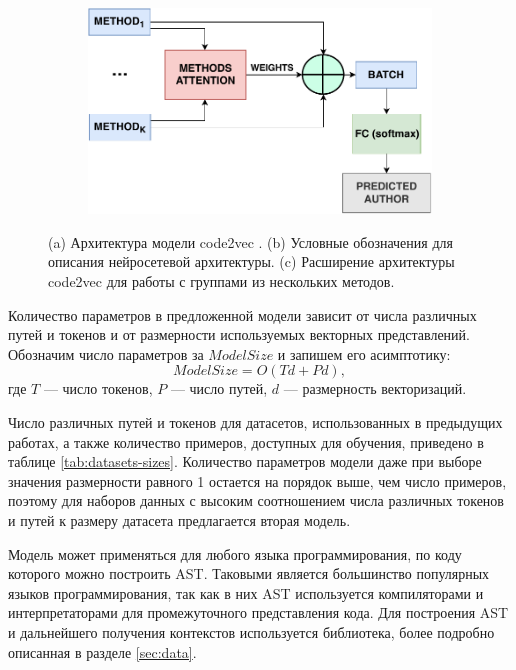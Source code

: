 \begin{figure}[ht]
\begin{subfigure}{0.34\linewidth}
       \caption{}
       \label{fig:code2vec-legend}
    \end{subfigure}
    \hfill
    \begin{subfigure}{0.54\linewidth}
       \centering
       \includegraphics[width=\linewidth]{images/Code2VecEnhanced.pdf}
       \caption{}
       \label{fig:code2vec-enhanced}
    \end{subfigure}
    \centering
    \caption{(a) Архитектура модели code2vec \cite{Alon2019}. (b) Условные обозначения для описания нейросетевой архитектуры. (c) Расширение архитектуры code2vec для работы с группами из нескольких методов.}
    \end{figure}

Количество параметров в предложенной модели зависит от числа различных путей и токенов и от размерности используемых векторных представлений. Обозначим число параметров за $ModelSize$ и запишем его асимптотику:
$$ModelSize = O(Td+Pd),$$
где $T$ — число токенов, $P$ — число путей, $d$ — размерность векторизаций.

Число различных путей и токенов для датасетов, использованных в предыдущих работах, а также количество примеров, доступных для обучения, приведено в таблице \ref{tab:datasets-sizes}. Количество параметров модели даже при выборе значения размерности равного 1 остается на порядок выше, чем число примеров, поэтому для наборов данных с высоким соотношением числа различных токенов и путей к размеру датасета предлагается вторая модель.

Модель может применяться для любого языка программирования, по коду которого можно построить AST. Таковыми является большинство популярных языков программирования, так как в них AST используется компиляторами и интерпретаторами для промежуточного представления кода. Для построения AST и дальнейшего получения контекстов используется библиотека, более подробно описанная в разделе \ref{sec:data}.

